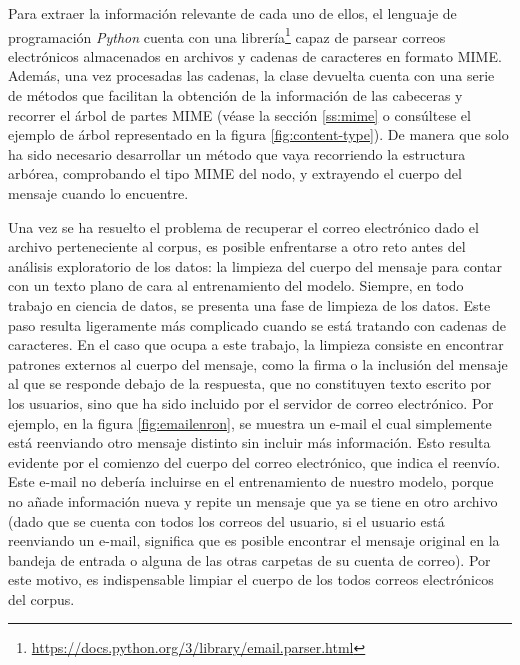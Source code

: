 Para extraer la información relevante de cada uno de ellos, el lenguaje de programación \textit{Python} cuenta con una librería\footnote{\url{https://docs.python.org/3/library/email.parser.html}} capaz de parsear correos electrónicos almacenados en archivos y cadenas de caracteres en formato MIME. Además, una vez procesadas las cadenas, la clase devuelta cuenta con una serie de métodos que facilitan la obtención de la información de las cabeceras y recorrer el árbol de partes MIME (véase la sección \ref{ss:mime} o consúltese el ejemplo de árbol representado en la figura \ref{fig:content-type}). De manera que solo ha sido necesario desarrollar un método que vaya recorriendo la estructura arbórea, comprobando el tipo MIME del nodo, y extrayendo el cuerpo del mensaje cuando lo encuentre.

Una vez se ha resuelto el problema de recuperar el correo electrónico dado el archivo perteneciente al corpus, es posible enfrentarse a otro reto antes del análisis exploratorio de los datos: la limpieza del cuerpo del mensaje para contar con un texto plano de cara al entrenamiento del modelo. Siempre, en todo trabajo en ciencia de datos, se presenta una fase de limpieza de los datos. Este paso resulta ligeramente más complicado cuando se está tratando con cadenas de caracteres. En el caso que ocupa a este trabajo, la limpieza consiste en encontrar patrones externos al cuerpo del mensaje, como la firma o la inclusión del mensaje al que se responde debajo de la respuesta, que no constituyen texto escrito por los usuarios, sino que ha sido incluido por el servidor de correo electrónico. Por ejemplo, en la figura \ref{fig:emailenron}, se muestra un e-mail el cual simplemente está reenviando otro mensaje distinto sin incluir más información. Esto resulta evidente por el comienzo del cuerpo del correo electrónico, que indica el reenvío. Este e-mail no debería incluirse en el entrenamiento de nuestro modelo, porque no añade información nueva y repite un mensaje que ya se tiene en otro archivo (dado que se cuenta con todos los correos del usuario, si el usuario está reenviando un e-mail, significa que es posible encontrar el mensaje original en la bandeja de entrada o alguna de las otras carpetas de su cuenta de correo). Por este motivo, es indispensable limpiar el cuerpo de los todos correos electrónicos del corpus.

